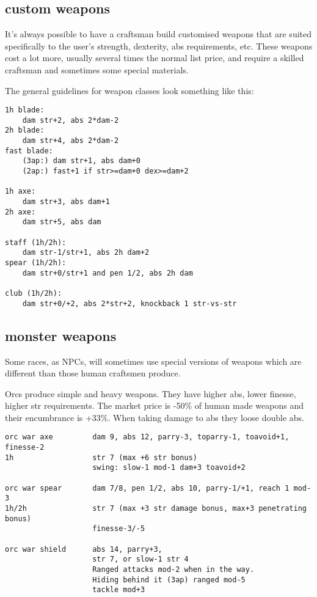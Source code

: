 \normalsize








\subsection*{custom weapons}
It's always possible to have a craftsman build customised weapons that are suited specifically to the user's strength, dexterity, abs requirements, etc. These weapons cost a lot more, usually several times the normal list price, and require a skilled craftsman and sometimes some special materials.

The general guidelines for weapon classes look something like this:\\
\small \begin{verbatim}
1h blade:
    dam str+2, abs 2*dam-2
2h blade:
    dam str+4, abs 2*dam-2
fast blade:
    (3ap:) dam str+1, abs dam+0
    (2ap:) fast+1 if str>=dam+0 dex>=dam+2

1h axe:
    dam str+3, abs dam+1
2h axe:
    dam str+5, abs dam

staff (1h/2h):
    dam str-1/str+1, abs 2h dam+2
spear (1h/2h):
    dam str+0/str+1 and pen 1/2, abs 2h dam

club (1h/2h):
    dam str+0/+2, abs 2*str+2, knockback 1 str-vs-str
\end{verbatim} \normalsize








\subsection*{monster weapons}
Some races, as NPCs, will sometimes use special versions of weapons which are different than those human craftsmen produce.

Orcs produce simple and heavy weapons. They have higher abs, lower finesse, higher str requirements. The market price is -50\% of human made weapons and their encumbrance is +33\%. When taking damage to abs they loose double abs.
\small \begin{verbatim}
orc war axe         dam 9, abs 12, parry-3, toparry-1, toavoid+1, finesse-2
1h                  str 7 (max +6 str bonus)
                    swing: slow-1 mod-1 dam+3 toavoid+2

orc war spear       dam 7/8, pen 1/2, abs 10, parry-1/+1, reach 1 mod-3
1h/2h               str 7 (max +3 str damage bonus, max+3 penetrating bonus)
                    finesse-3/-5

orc war shield      abs 14, parry+3,
                    str 7, or slow-1 str 4
                    Ranged attacks mod-2 when in the way.
                    Hiding behind it (3ap) ranged mod-5
                    tackle mod+3
\end{verbatim} \normalsize
\pagebreak[1]

